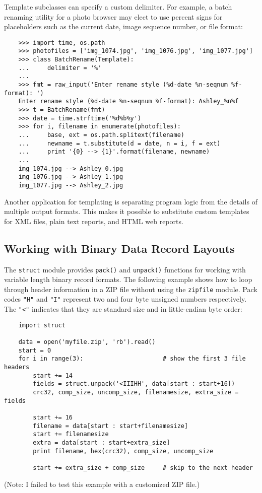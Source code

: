 \documentclass[UTF8]{article}
\begin{document}
Template subclasses can specify a custom delimiter. For example, a batch renaming utility for a
photo browser may elect to use percent signs for placeholders such as the current date, image
sequence number, or file format:
\begin{verbatim}
    >>> import time, os.path
    >>> photofiles = ['img_1074.jpg', 'img_1076.jpg', 'img_1077.jpg']
    >>> class BatchRename(Template):
    ...     delimiter = '%'
    ...
    >>> fmt = raw_input('Enter rename style (%d-date %n-seqnum %f-format): ')
    Enter rename style (%d-date %n-seqnum %f-format): Ashley_%n%f
    >>> t = BatchRename(fmt)
    >>> date = time.strftime('%d%b%y')
    >>> for i, filename in enumerate(photofiles):
    ...     base, ext = os.path.splitext(filename)
    ...     newname = t.substitute(d = date, n = i, f = ext)
    ...     print '{0} --> {1}'.format(filename, newname)
    ...
    img_1074.jpg --> Ashley_0.jpg
    img_1076.jpg --> Ashley_1.jpg
    img_1077.jpg --> Ashley_2.jpg
\end{verbatim}

Another application for templating is separating program logic from the details of multiple output
formats. This makes it possible to substitute custom templates for XML files, plain text reports,
and HTML web reports.

\subsection{Working with Binary Data Record Layouts}
The \texttt{struct} module provides \texttt{pack()} and \texttt{unpack()} functions for working
with variable length binary record formats. The following example shows how to loop through header
information in a ZIP file without using the \texttt{zipfile} module. Pack codes \texttt{"H"} and
\texttt{"I"} represent two and four byte unsigned numbers respectively. The \texttt{"<"} indicates
that they are standard size and in little-endian byte order:
\begin{verbatim}
    import struct

    data = open('myfile.zip', 'rb').read()
    start = 0
    for i in range(3):                      # show the first 3 file headers
        start += 14
        fields = struct.unpack('<IIIHH', data[start : start+16])
        crc32, comp_size, uncomp_size, filenamesize, extra_size = fields

        start += 16
        filename = data[start : start+filenamesize]
        start += filenamesize
        extra = data[start : start+extra_size]
        print filename, hex(crc32), comp_size, uncomp_size

        start += extra_size + comp_size     # skip to the next header
\end{verbatim}
(Note: I failed to test this example with a customized ZIP file.)
\end{document}
